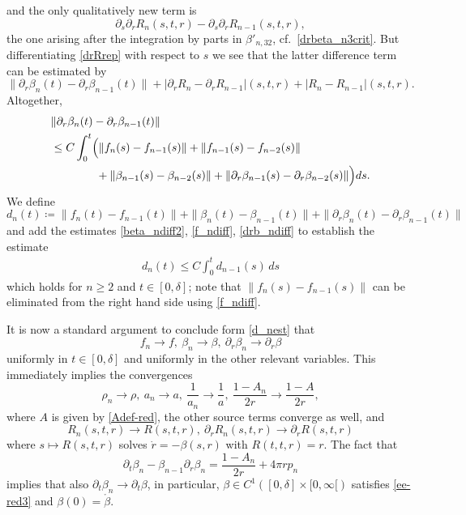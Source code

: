 \documentclass[11pt]{article}
\begin{document}
and the only qualitatively new term is
\[
\partial_s\partial_r R_n(s,t,r) - \partial_s\partial_r R_{n-1}(s,t,r),
\]
the one arising
after the integration by parts in $\beta'_{n,32}$,
cf.\ \eqref{drbeta_n3crit}. But
differentiating \eqref{drRrep} with respect to $s$ we see that the latter
difference term can be estimated by
\[
\|\partial_r \beta_{n}(t) - \partial_r \beta_{n-1}(t)\|+
|\partial_r R_n - \partial_r R_{n-1}|(s,t,r)+
|R_n - R_{n-1}|(s,t,r).
\]
Altogether, 
\begin{align}\label{drb_ndiff}
  &\|\partial_r \beta_{n}(t) - \partial_r \beta_{n-1}(t)\| \notag\\
  &\leq
  C \int_0^t\Bigl(\|f_{n}(s)-f_{n-1}(s)\| +\|f_{n-1}(s)-f_{n-2}(s)\|
  \notag\\
  &\qquad\qquad {}
  + \|\beta_{n-1}(s)-\beta_{n-2}(s)\|+
  \|\partial_r\beta_{n-1}(s)-\partial_r\beta_{n-2}(s)\|\Bigr) ds.
\end{align}
We define
\[
d_n(t)\coloneqq
\|f_{n}(t) - f_{n-1}(t)\| + \|\beta_{n}(t) - \beta_{n-1}(t)\|
+\|\partial_r \beta_{n}(t) - \partial_r \beta_{n-1}(t)\|
\]
and add the estimates \eqref{beta_ndiff2}, \eqref{f_ndiff}, \eqref{drb_ndiff}
to establish the estimate
\begin{align}\label{d_nest}
d_n(t) \leq C \int_0^t d_{n-1}(s)\, ds
\end{align}
which holds for $n\geq 2$ and $t\in [0,\delta]$; note that
$\|f_{n}(s) - f_{n-1}(s)\|$ can be eliminated from the right hand side
using \eqref{f_ndiff}.

It is now a standard argument to conclude form \eqref{d_nest} that
\[
f_n \to f,\ \beta_n \to \beta,\ \partial_r \beta_n \to \partial_r \beta
\]
uniformly in $t\in [0,\delta]$ and uniformly in the other relevant variables.
This immediately implies the convergences
\[
\rho_n \to \rho,\ a_n \to a,\ \frac{1}{a_n} \to \frac{1}{a},\
\frac{1-A_n}{2r} \to \frac{1-A}{2r},
\]
where $A$ is given by \eqref{Adef-red},
the other source terms converge as well, and
\[
R_n(s,t,r)\to R(s,t,r),\ \partial_r R_n(s,t,r)\to \partial_r R(s,t,r)
\]
where $s\mapsto R(s,t,r)$ solves $\dot r = -\beta(s,r)$ with $R(t,t,r)=r$.
The fact that
\[
\partial_t \beta_n - \beta_{n-1}\partial_r \beta_n
= \frac{1-A_n}{2r} + 4 \pi r p_n
\]
implies that also $\partial_t \beta_n \to \partial_t \beta$, in particular,
$\beta\in C^1([0,\delta]\times [0,\infty[)$ satisfies
\eqref{ee-red3} and $\beta(0)=\mathring{\beta}$.
%
%
\end{document}
